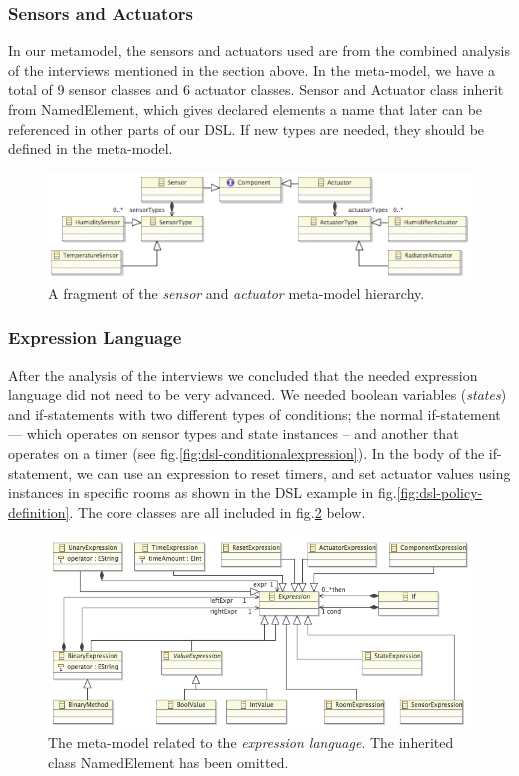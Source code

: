 \subsubsection{Sensors and Actuators}
In our metamodel, the sensors and actuators used are from the combined analysis of the interviews mentioned in the section above. In the meta-model, we have a total of 9 sensor classes and 6 actuator classes. Sensor and Actuator class inherit from NamedElement, which gives declared elements a name that later can be referenced in other parts of our DSL. If new types are needed, they should be defined in the meta-model.

\begin{figure}[h]
	\centering
    \includegraphics[scale=.7]{ecore-sensors-actuators.png} 
	\caption{A fragment of the \textit{sensor} and \textit{actuator} meta-model hierarchy.}
	\label{fig:ecore-sensors-actuators}
\end{figure}


\subsubsection{Expression Language}
After the analysis of the interviews we concluded that the needed expression language did not need to be very advanced. We needed boolean variables (\textit{states}) and if-statements with two different types of conditions; the normal if-statement --- which operates on sensor types and state instances -- and another that operates on a timer (see fig.\ref{fig:dsl-conditionalexpression}). In the body of the if-statement, we can use an expression to reset timers, and set actuator values using instances in specific rooms as shown in the DSL example in fig.\ref{fig:dsl-policy-definition}. The core classes are all included in fig.\ref{fig:ecore-expression-language} below.

\begin{figure}[h]
  \centering
    \includegraphics[scale=.5]{ecore-expression-language.png} 
	\caption{The meta-model related to the \textit{expression language}. The inherited class NamedElement has been omitted.}
	\label{fig:ecore-expression-language}
\end{figure}

